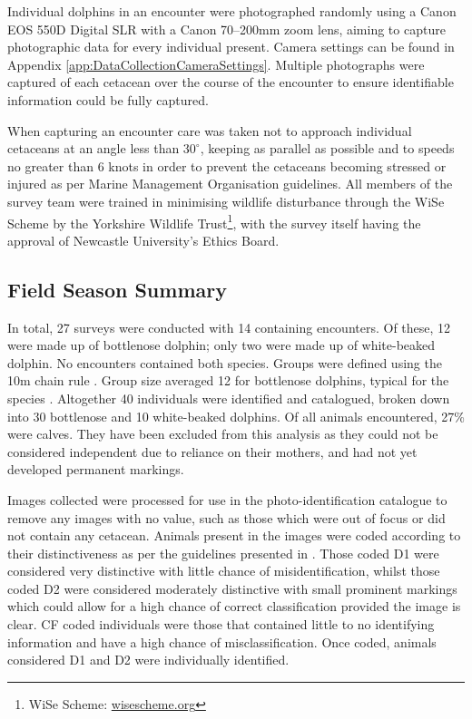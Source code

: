 Individual dolphins in an encounter were photographed randomly using a Canon EOS 550D Digital SLR with a Canon 70–200mm zoom lens, aiming to capture photographic data for every individual present. Camera settings can be found in Appendix \ref{app:DataCollectionCameraSettings}. Multiple photographs were captured of each cetacean over the course of the encounter to ensure identifiable information could be fully captured. 

When capturing an encounter care was taken not to approach individual cetaceans at an angle less than $30^{\circ}$, keeping as parallel as possible and to speeds no greater than 6 knots in order to prevent the cetaceans becoming stressed or injured as per Marine Management Organisation guidelines. All members of the survey team were trained in minimising wildlife disturbance through the WiSe Scheme by the Yorkshire Wildlife Trust\footnote{WiSe Scheme: \href{https://www.wisescheme.org/}{wisescheme.org}}, with the survey itself having the approval of Newcastle University's Ethics Board.

\subsection{Field Season Summary}\label{ch:NDD,sec:dataCollection,sub:summary}

In total, 27 surveys were conducted with 14 containing encounters. Of these, 12 were made up of bottlenose dolphin; only two were made up of white-beaked dolphin. No encounters contained both species. Groups were defined using the 10m chain rule \cite{smolker_sex_1992}. Group size averaged 12 for bottlenose dolphins, typical for the species \cite{shane_ecology_1986}. Altogether 40 individuals were identified and catalogued, broken down into 30 bottlenose and 10 white-beaked dolphins. Of all animals encountered, 27\% were calves. They have been excluded from this analysis as they could not be considered independent due to reliance on their mothers, and had not yet developed permanent markings.

Images collected were processed for use in the photo-identification catalogue to remove any images with no value, such as those which were out of focus or did not contain any cetacean. Animals present in the images were coded according to their distinctiveness as per the guidelines presented in \cite{urian_recommendations_2015}. Those coded D1 were considered very distinctive with little chance of misidentification, whilst those coded D2 were considered moderately distinctive with small prominent markings which could allow for a high chance of correct classification provided the image is clear. CF coded individuals were those that contained little to no identifying information and have a high chance of misclassification. Once coded, animals considered D1 and D2 were individually identified.

